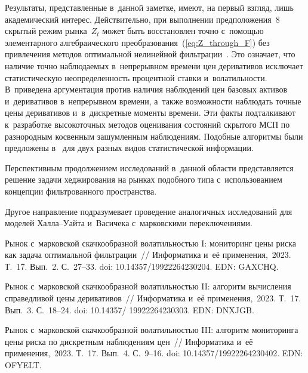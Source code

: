 \begin{multicols}{2}
Результаты, представленные в~данной заметке, имеют, на первый взгляд, лишь академический интерес. 
Действительно, при выполнении предположения~8 скрытый режим рынка~$Z_t$ может быть\linebreak
 восстановлен точно с~по\-мощью 
элементарного алгебраического преобразования~(\ref{eq:Z_through_F}) без привлечения методов оптимальной нелинейной фильт\-ра\-ции~\cite{B_21_1_IA}. 
Это означает, что наличие точно \mbox{наблюдаемых} в~непрерывном времени цен деривативов исключает статистическую неопределенность 
процентной ставки и~волатильности. В~\cite{B_23_3_IA}\linebreak приведена аргументация против наличия наблюдений цен базовых активов 
и~деривативов в~непрерывном времени, а~также воз\-мож\-ности наблюдать точные цены деривативов и~в~дискретные 
моменты \mbox{времени}. Эти факты подталкивают к~разработке высокоточных методов оценивания состояний скрытого МСП по разнородным косвенным 
зашумленным наблюдениям. 
Подобные алгоритмы были\linebreak
 предложены в~\cite{B_23_3_IA, B_23_4_IA} для двух разных видов статистической информации. 

Перспективным продолжением исследований в~данной об\-ласти пред\-став\-ля\-ет\-ся решение задачи хеджирования на рынках 
подобного типа с~использованием концепции фильт\-ро\-ван\-но\-го пространства. 

Другое на\-прав\-ле\-ние подразумевает проведение 
аналогичных исследований для моделей Хал\-ла--Уай\-та и~Васичека с~марковскими переключениями.
{ %

}


{\small\frenchspacing
 {\baselineskip=11.5pt
 \begin{thebibliography}{99}
 Рынок с~марковской скачкообразной волатильностью I: мониторинг цены риска как задача оптимальной фильтрации~// 
Информатика и~её применения,~2023. Т.~17. Вып.~2. С.~27--33. doi: 10.14357/19922264230204. EDN: GAXCHQ.

 Рынок с~марковской скачкообразной волатильностью II: алгоритм вычисления справедливой цены деривативов~// 
Информатика и~её применения,~2023. Т.~17. Вып.~3. С.~18--24. doi: 10.14357/ 19922264230303. EDN: DNXJGB.

 Рынок с~марковской скачкообразной волатильностью III:
алгоритм мониторинга цены риска по дискретным наблюдениям цен~// Информатика и~её применения,~2023. Т.~17. Вып.~4. С.~9--16. 
doi: 10.14357/19922264230402. EDN: OFYELT.


\end{thebibliography}}}
\end{multicols}
